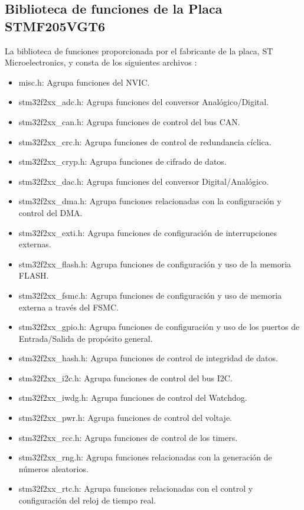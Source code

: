 \subsection{Biblioteca de funciones de la Placa STMF205VGT6}
\label{sec:bibFunc}
La biblioteca de funciones proporcionada por el fabricante de la placa, ST Microelectronics, y consta de los siguientes archivos \cite{bib:libdesc}:
\begin{itemize}
\item misc.h: Agrupa funciones del \acf{NVIC}.
\item stm32f2xx\_adc.h: Agrupa funciones del conversor Analógico/Digital.
\item stm32f2xx\_can.h: Agrupa funciones de control del bus CAN.
\item stm32f2xx\_crc.h: Agrupa funciones de control de redundancia cíclica.
\item stm32f2xx\_cryp.h: Agrupa funciones de cifrado de datos.
\item stm32f2xx\_dac.h: Agrupa funciones del conversor Digital/Analógico.
\item stm32f2xx\_dma.h: Agrupa funciones relacionadas con la configuración y control del DMA.
\item stm32f2xx\_exti.h: Agrupa funciones de configuración de interrupciones externas.
\item stm32f2xx\_flash.h: Agrupa funciones de configuración y uso de la memoria FLASH.
\item stm32f2xx\_fsmc.h: Agrupa funciones de configuración y uso de memoria externa a través del FSMC.
\item stm32f2xx\_gpio.h: Agrupa funciones de configuración y uso de los puertos de Entrada/Salida de propósito general.
\item stm32f2xx\_hash.h: Agrupa funciones de control de integridad de datos.
\item stm32f2xx\_i2c.h: Agrupa funciones de control del bus I2C.
\item stm32f2xx\_iwdg.h: Agrupa funciones de control del Watchdog.
\item stm32f2xx\_pwr.h: Agrupa funciones de control del voltaje.
\item stm32f2xx\_rcc.h: Agrupa funciones de control de los timers.
\item stm32f2xx\_rng.h: Agrupa funciones relacionadas con la generación de números aleatorios.
\item stm32f2xx\_rtc.h: Agrupa funciones relacionadas con el control y configuración del reloj de tiempo real.

\end{itemize}
